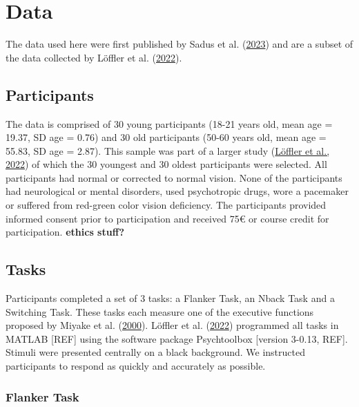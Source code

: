 \documentclass[
  man,floatsintext]{apa7}
\begin{document}
\hypertarget{data}{%
\section{Data}\label{data}}

The data used here were first published by Sadus et al. (\protect\hyperlink{ref-sadus2023multiverse}{2023}) and are a subset of the data collected by Löffler et al. (\protect\hyperlink{ref-loffler2022common}{2022}).

\hypertarget{participants}{%
\subsection{Participants}\label{participants}}

The data is comprised of 30 young participants (18-21 years old, mean age = 19.37, SD age = 0.76) and 30 old participants (50-60 years old, mean age = 55.83, SD age = 2.87). This sample was part of a larger study (\protect\hyperlink{ref-loffler2022common}{Löffler et al., 2022}) of which the 30 youngest and 30 oldest participants were selected. All participants had normal or corrected to normal vision. None of the participants had neurological or mental disorders, used psychotropic drugs, wore a pacemaker or suffered from red-green color vision deficiency. The participants provided informed consent prior to participation and received 75€ or course credit for participation. \textbf{ethics stuff?}

\hypertarget{tasks}{%
\subsection{Tasks}\label{tasks}}

Participants completed a set of 3 tasks: a Flanker Task, an Nback Task and a Switching Task. These tasks each measure one of the executive functions proposed by Miyake et al. (\protect\hyperlink{ref-miyake2000unity}{2000}). Löffler et al. (\protect\hyperlink{ref-loffler2022common}{2022}) programmed all tasks in MATLAB {[}REF{]} using the software package Psychtoolbox {[}version 3-0.13, REF{]}. Stimuli were presented centrally on a black background. We instructed participants to respond as quickly and accurately as possible.

\hypertarget{flanker-task}{%
\subsubsection{Flanker Task}\label{flanker-task}}
\end{document}
